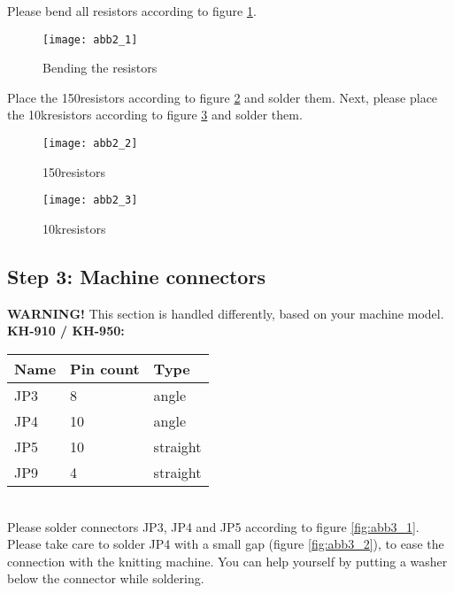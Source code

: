 \documentclass[fleqn,10pt]{SelfArx} %
\begin{document}
Please bend all resistors according to figure \ref{fig:abb2_1}.

\begin{figure}[tbhp]\centering
\texttt{[image: abb2\_1]}
\caption{Bending the resistors}
\label{fig:abb2_1}
\end{figure}

Place the 150\textOmega resistors according to figure \ref{fig:abb2_2} and solder them. Next, please place the 10k\textOmega resistors according to figure \ref{fig:abb2_3} and solder them.

\begin{figure}[tbhp]\centering
\texttt{[image: abb2\_2]}
\caption{150\textOmega resistors}
\label{fig:abb2_2}
\end{figure}

\begin{figure}[tbhp]\centering
\texttt{[image: abb2\_3]}
\caption{10k\textOmega resistors}
\label{fig:abb2_3}
\end{figure}

\FloatBarrier

 \subsection*{Step 3: Machine connectors}

\textbf{WARNING!} This section is handled differently, based on your machine model.\\

\textbf{KH-910 / KH-950:} \\

\begin{tabular}{lll}
\hline
\textbf{Name} & \textbf{Pin count}  & \textbf{Type} \\ \hline
JP3           & 8                 & angle        \\ \hline
JP4           & 10                & angle        \\ \hline
JP5           & 10                & straight     \\ \hline
JP9           & 4                 & straight     \\ \hline
\end{tabular}\\

Please solder connectors JP3, JP4 and JP5 according to figure \ref{fig:abb3_1}. Please take care to solder JP4 with a small gap (figure \ref{fig:abb3_2}), to ease the connection with the knitting machine. You can help yourself by putting a washer below the connector while soldering.
\end{document}

